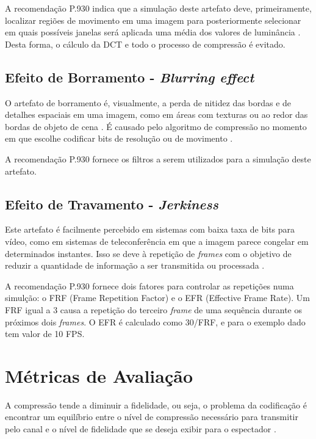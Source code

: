 A recomendação P.930 indica que a simulação deste artefato deve, primeiramente, localizar regiões de movimento em uma imagem para posteriormente selecionar em quais possíveis janelas será aplicada uma média dos valores de luminância \cite{itup930}. Desta forma, o cálculo da DCT e todo o processo de compressão é evitado.

\subsection{Efeito de Borramento - \emph{Blurring effect}}

O artefato de borramento é, visualmente, a perda de nitidez das bordas e de detalhes espaciais em uma imagem, como em áreas com texturas ou ao redor das bordas de objeto de cena \cite{wurao2005}. É causado pelo algoritmo de compressão no momento em que escolhe codificar bits de resolução ou de movimento \cite{itup930}.

A recomendação P.930 fornece os filtros a serem utilizados para a simulação deste artefato.

\subsection{Efeito de Travamento - \emph{Jerkiness}}

Este artefato é facilmente percebido em sistemas com baixa taxa de bits para vídeo, como em sistemas de teleconferência \cite{itup930} em que a imagem parece congelar em determinados instantes. Isso se deve à repetição de \emph{frames} com o objetivo de reduzir a quantidade de informação a ser transmitida ou processada \cite{itup930}.

A recomendação P.930 fornece dois fatores para controlar as repetições numa simulção: o FRF (Frame Repetition Factor) e o EFR (Effective Frame Rate). Um FRF igual a 3 causa a repetição do terceiro \emph{frame} de uma sequência durante os próximos dois \emph{frames}. O EFR é calculado como 30/FRF, e para o exemplo dado tem valor de 10 FPS.

\section{Métricas de Avaliação}

A compressão tende a diminuir a fidelidade, ou seja, o problema da codificação é encontrar um equilíbrio entre o nível de compressão necessário para transmitir pelo canal e o nível de fidelidade que se deseja exibir para o espectador \cite{daronco}.

